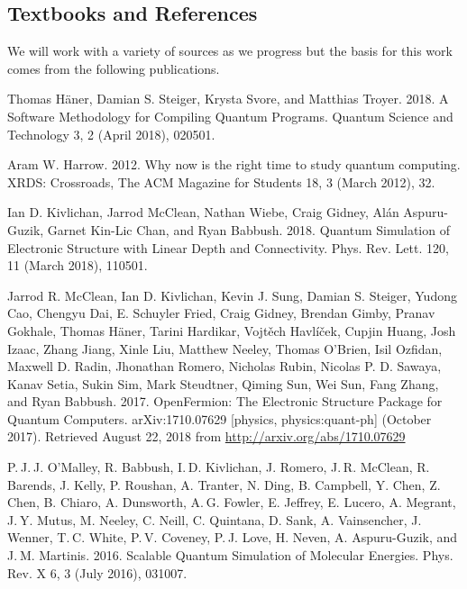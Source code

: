 \documentclass[10pt]{article}
\begin{document}
\subsection{Textbooks and References}

We will work with a variety of sources as we progress but the basis for this work comes from the following publications.

\vspace{.05in}
\noindent
[1]Thomas Häner, Damian S. Steiger, Krysta Svore, and Matthias Troyer. 2018. A Software Methodology for Compiling Quantum Programs. Quantum Science and Technology 3, 2 (April 2018), 020501.

\vspace{.05in}
\noindent
[2]Aram W. Harrow. 2012. Why now is the right time to study quantum computing. XRDS: Crossroads, The ACM Magazine for Students 18, 3 (March 2012), 32.

\vspace{.05in}
\noindent
[3]Ian D. Kivlichan, Jarrod McClean, Nathan Wiebe, Craig Gidney, Alán Aspuru-Guzik, Garnet Kin-Lic Chan, and Ryan Babbush. 2018. Quantum Simulation of Electronic Structure with Linear Depth and Connectivity. Phys. Rev. Lett. 120, 11 (March 2018), 110501.

\vspace{.05in}
\noindent
[4]Jarrod R. McClean, Ian D. Kivlichan, Kevin J. Sung, Damian S. Steiger, Yudong Cao, Chengyu Dai, E. Schuyler Fried, Craig Gidney, Brendan Gimby, Pranav Gokhale, Thomas Häner, Tarini Hardikar, Vojtěch Havlíček, Cupjin Huang, Josh Izaac, Zhang Jiang, Xinle Liu, Matthew Neeley, Thomas O’Brien, Isil Ozfidan, Maxwell D. Radin, Jhonathan Romero, Nicholas Rubin, Nicolas P. D. Sawaya, Kanav Setia, Sukin Sim, Mark Steudtner, Qiming Sun, Wei Sun, Fang Zhang, and Ryan Babbush. 2017. OpenFermion: The Electronic Structure Package for Quantum Computers. arXiv:1710.07629 [physics, physics:quant-ph] (October 2017). Retrieved August 22, 2018 from \url{http://arxiv.org/abs/1710.07629}

\vspace{.05in}
\noindent
[5]P. J. J. O’Malley, R. Babbush, I. D. Kivlichan, J. Romero, J. R. McClean, R. Barends, J. Kelly, P. Roushan, A. Tranter, N. Ding, B. Campbell, Y. Chen, Z. Chen, B. Chiaro, A. Dunsworth, A. G. Fowler, E. Jeffrey, E. Lucero, A. Megrant, J. Y. Mutus, M. Neeley, C. Neill, C. Quintana, D. Sank, A. Vainsencher, J. Wenner, T. C. White, P. V. Coveney, P. J. Love, H. Neven, A. Aspuru-Guzik, and J. M. Martinis. 2016. Scalable Quantum Simulation of Molecular Energies. Phys. Rev. X 6, 3 (July 2016), 031007.
\end{document}
